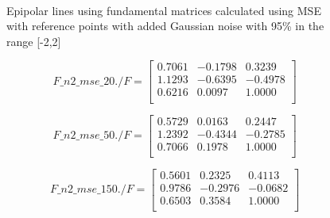 \documentclass[peerreview,11pt]{IEEEtran}
\begin{document}
\begin{figure}[ht]
	~
	\\
		
		
	\caption{Epipolar lines using fundamental matrices calculated using MSE with reference points with added Gaussian noise with 95\% in the range [-2,2]}
	\label{fig:mse_n2}
\end{figure}


\[
F\_n2\_mse\_20./F = 
\begin{bmatrix}
    0.7061  & -0.1798  &  0.3239\\
    1.1293  & -0.6395  & -0.4978\\
    0.6216  &  0.0097  &  1.0000\\
\end{bmatrix}
\]


\[
F\_n2\_mse\_50./F = 
\begin{bmatrix}
    0.5729  &  0.0163  &  0.2447\\
    1.2392  & -0.4344  & -0.2785\\
    0.7066  &  0.1978  &  1.0000\\
\end{bmatrix}
\]


\[
F\_n2\_mse\_150./F = 
\begin{bmatrix}
    0.5601  &  0.2325  &  0.4113\\
    0.9786  & -0.2976  & -0.0682\\
    0.6503  &  0.3584  &  1.0000\\
\end{bmatrix}
\]
\end{document}
